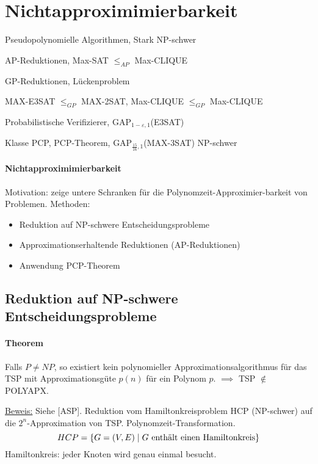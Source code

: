 \section{Nichtapproximimierbarkeit}

\begin{takeaway}
    \item Pseudopolynomielle Algorithmen, Stark NP-schwer
    \item AP-Reduktionen, Max-SAT $\leq_{AP}$ Max-CLIQUE
    \item GP-Reduktionen, Lückenproblem
    \item MAX-E3SAT $\leq_{GP}$ MAX-2SAT, Max-CLIQUE $\leq_{GP}$ Max-CLIQUE
    \item Probabilistische Verifizierer, GAP$_{1-\varepsilon, 1}$(E3SAT)
    \item Klasse PCP, PCP-Theorem, GAP$_{\frac{15}{16}, 1}$(MAX-3SAT) NP-schwer
\end{takeaway}

\paragraph{Nichtapproximimierbarkeit}
Motivation: zeige untere Schranken für die Polynomzeit-Approximier-barkeit von Problemen.
Methoden:
\begin{itemize}
    \item Reduktion auf NP-schwere Entscheidungsprobleme
    \item Approximationserhaltende Reduktionen (AP-Reduktionen)
    \item Anwendung PCP-Theorem
\end{itemize}


\subsection{Reduktion auf NP-schwere Entscheidungsprobleme}

\paragraph{Theorem}
Falls $P \neq NP$, so existiert kein polynomieller Approximationsalgorithmus für das TSP
mit Approximationsgüte $p(n)$ für ein Polynom $p$.
$\implies$ TSP $\notin$ POLYAPX.

\underline{Beweis:}
Siehe [ASP]. Reduktion vom Hamiltonkreisproblem HCP (NP-schwer) auf die $2^n$-Approximation von TSP.
Polynomzeit-Transformation.
$$ HCP = \{ G=(V,E) \; | \; G \text{ enthält einen Hamiltonkreis} \} $$
Hamiltonkreis: jeder Knoten wird genau einmal besucht.

